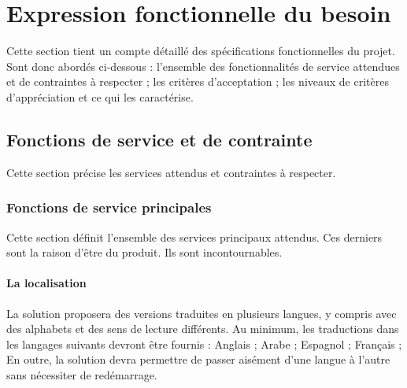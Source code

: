 \documentclass[11pt,fleqn]{book} %
\begin{document}
\pagestyle{empty} %

\tableofcontents %


\pagestyle{fancy} %






\chapter{Expression fonctionnelle du besoin}
Cette section tient un compte détaillé des spécifications fonctionnelles du projet. Sont donc abordés ci-dessous :
l'ensemble des fonctionnalités de service attendues et de contraintes à respecter ;
les critères d'acceptation ;
les niveaux de critères d'appréciation et ce qui les caractérise. 

\section{Fonctions de service et de contrainte}
Cette section précise les services attendus et contraintes à respecter.

\subsection{Fonctions de service principales}
Cette section définit l'ensemble des services principaux attendus. Ces derniers sont la raison d'être du produit. Ils sont incontournables.

\subsubsection{La localisation}
La solution proposera des versions traduites en plusieurs langues, y compris avec des alphabets et des sens de lecture différents. Au minimum, les traductions dans les langages suivants devront être fournis :
Anglais ;
Arabe ;
Espagnol ;
Français ;
En outre, la solution devra permettre de passer aisément d'une langue à l'autre sans nécessiter de redémarrage.
\end{document}
